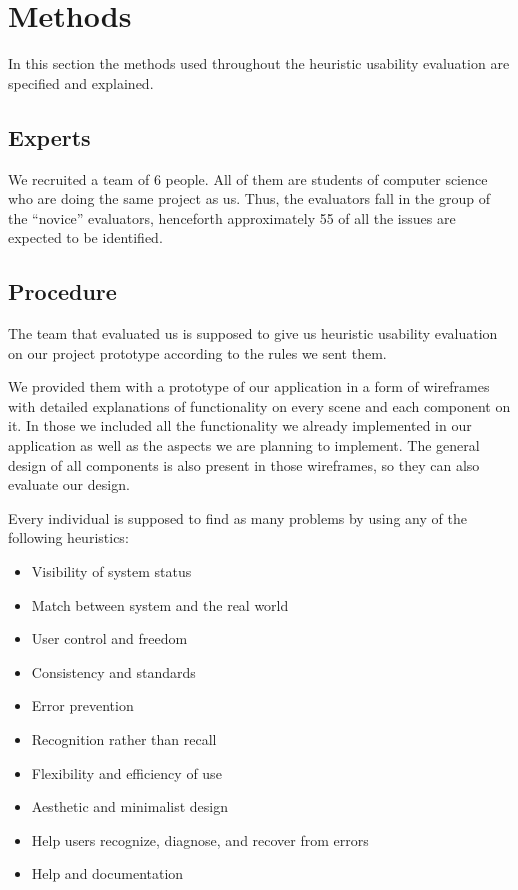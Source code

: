 \section{Methods}

In this section the methods used throughout the heuristic usability evaluation are specified and explained.


\subsection{Experts}


We recruited a team of 6 people. All of them are students of computer science who are doing the same project as us. Thus, the evaluators fall in the group of the “novice” evaluators, henceforth approximately 55 of all the issues\cite{nielsen94} are expected to be identified.

\subsection{Procedure}


The team that evaluated us is supposed to give us heuristic usability evaluation on our project prototype according to the rules we sent them.

We provided them with a prototype of our application in a form of wireframes with detailed explanations of functionality on every scene and each component on it. In those we included all the functionality we already implemented in our application as well as the aspects we are planning to implement. The general design of all components is also present in those wireframes, so they can also evaluate our design.

Every individual is supposed to find as many problems by using any of the following heuristics\cite{ten-heuristics}: 

\begin{itemize}
\item Visibility of system status
\item Match between system and the real world
\item User control and freedom
\item Consistency and standards
\item Error prevention
\item Recognition rather than recall
\item Flexibility and efficiency of use
\item Aesthetic and minimalist design
\item Help users recognize, diagnose, and recover from errors
\item Help and documentation
\end{itemize}

